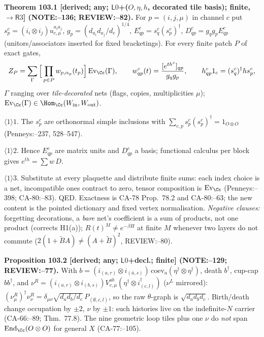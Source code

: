 \textbf{Theorem 103.1 [derived; any; \(\mathsf L0\)+(\(O,\eta,h\), decorated tile basis); finite, \(\to\mathsf R3\)] (NOTE:--136; REVIEW:--82).}
For \(p=(i,j,\mu)\) in channel \(c\) put \(s^c_p=(i_i\otimes i_j)u^{a_ia_j}_{c,\mu}\), \(g_p=(d_{a_i}d_{a_j}/d_c)^{1/4}\),
\(E^c_{qp}=s^c_q(s^c_p)^\dagger\), \(D^c_{qp}=g_qg_pE^c_{qp}\) (unitors/associators inserted for fixed bracketings). For every finite
patch \(P\) of exact gates,
\begin{equation}\label{eq:103-patch}
 Z_P=\sum_\Gamma\Big[\prod_{p\in P}w_{p,\alpha_p}(t_p)\Big]\operatorname{Ev}_\Cc(\Gamma),\qquad
 w^c_{qp}(t)=\frac{[e^{th^c}]_{qp}}{g_qg_p},\qquad h^c_{qp}1_c=(s^c_q)^\dagger hs^c_p ,
\end{equation}
\(\Gamma\) ranging over \emph{tile-decorated} nets (flags, copies, multiplicities \(\mu\)); \(\operatorname{Ev}_\Cc(\Gamma)\in\Hom_\Cc(W_{\rm in},W_{\rm out})\).
\par\(\langle1\rangle1\). The \(s^c_p\) are orthonormal simple inclusions with \(\sum_{c,p}s^c_p(s^c_p)^\dagger=1_{O\otimes O}\) (Penneys:--237, 528--547).
\par\(\langle1\rangle2\). Hence \(E^c_{qp}\) are matrix units and \(D^c_{qp}\) a basis; functional calculus per block gives \(e^{th}=\sum w\,D\).
\par\(\langle1\rangle3\). Substitute at every plaquette and distribute finite sums: each index choice is a net, incompatible ones contract to
zero, tensor composition is \(\operatorname{Ev}_\Cc\) (Penneys:--398; CA-80:--83). QED.
Exactness is CA-78 Prop.~78.2 and CA-80:--63; the new content is the pointed dictionary and fixed vertex normalisation.
\emph{Negative clauses:} forgetting decorations, a \emph{bare} net's coefficient is a sum of products, not one product (corrects H1(a));
\(R(t)^M\neq e^{-\beta H}\) at finite \(M\) whenever two layers do not commute (\(2(1+\tilde BA)\neq(A+\tilde B)^2\), REVIEW:--80).

\textbf{Proposition 103.2 [derived; any; \(\mathsf L0\)+decl.; finite] (NOTE:--129; REVIEW:--77).}
With \(b=(i_{(a,r)}\otimes i_{(\bar a,s)})\,\mathrm{coev}_a(\eta^\dagger\otimes\eta^\dagger)\), death \(b^\dagger\), cup-cap \(bb^\dagger\), and
\(\nu^R=(i_{(a,r)}\otimes i_{(b,s)})V^{ab}_{c,\mu}(\eta^\dagger\otimes i^\dagger_{(c,l)})\) (\(\nu^L\) mirrored):
\((\nu^R_\mu)^\dagger\nu^R_\nu=\delta_{\mu\nu}\sqrt{d_ad_b/d_c}\,P_{(\emptyset,c,l)}\), so the raw \(\theta\)-graph is \(\sqrt{d_ad_bd_c}\).
Birth/death change occupation by \(\pm2\), \(\nu\) by \(\pm1\): such histories live on the indefinite-\(N\) carrier (CA-66:--89; Thm.~77.8).
The nine geometric loop tiles plus one \(\nu\) do \emph{not} span \(\operatorname{End}_\Cc(O\otimes O)\) for general \(X\) (CA-77:--105).

